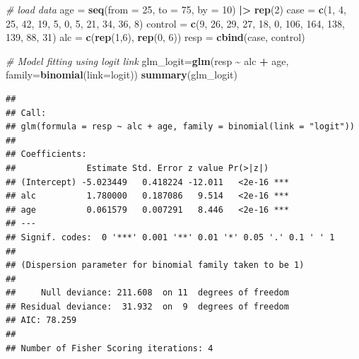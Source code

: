 \documentclass[
]{article}
\newenvironment{Shaded}{\begin{snugshade}}{\end{snugshade}}
\newcommand{\AttributeTok}[1]{\textcolor[rgb]{0.13,0.29,0.53}{#1}}
\newcommand{\CommentTok}[1]{\textcolor[rgb]{0.56,0.35,0.01}{\textit{#1}}}
\newcommand{\DecValTok}[1]{\textcolor[rgb]{0.00,0.00,0.81}{#1}}
\newcommand{\FunctionTok}[1]{\textcolor[rgb]{0.13,0.29,0.53}{\textbf{#1}}}
\newcommand{\NormalTok}[1]{#1}
\newcommand{\OtherTok}[1]{\textcolor[rgb]{0.56,0.35,0.01}{#1}}
\newcommand{\SpecialCharTok}[1]{\textcolor[rgb]{0.81,0.36,0.00}{\textbf{#1}}}
\newcommand{\StringTok}[1]{\textcolor[rgb]{0.31,0.60,0.02}{#1}}
\begin{document}
\begin{Shaded}
\begin{Highlighting}[]
\CommentTok{\# load data}
\NormalTok{age }\OtherTok{=} \FunctionTok{seq}\NormalTok{(}\AttributeTok{from =} \DecValTok{25}\NormalTok{, }\AttributeTok{to =} \DecValTok{75}\NormalTok{, }\AttributeTok{by =} \DecValTok{10}\NormalTok{) }\SpecialCharTok{|\textgreater{}} 
  \FunctionTok{rep}\NormalTok{(}\DecValTok{2}\NormalTok{)}
\NormalTok{case }\OtherTok{=} \FunctionTok{c}\NormalTok{(}\DecValTok{1}\NormalTok{, }\DecValTok{4}\NormalTok{, }\DecValTok{25}\NormalTok{, }\DecValTok{42}\NormalTok{, }\DecValTok{19}\NormalTok{, }\DecValTok{5}\NormalTok{, }\DecValTok{0}\NormalTok{, }\DecValTok{5}\NormalTok{, }\DecValTok{21}\NormalTok{, }\DecValTok{34}\NormalTok{, }\DecValTok{36}\NormalTok{, }\DecValTok{8}\NormalTok{)}
\NormalTok{control }\OtherTok{=} \FunctionTok{c}\NormalTok{(}\DecValTok{9}\NormalTok{, }\DecValTok{26}\NormalTok{, }\DecValTok{29}\NormalTok{, }\DecValTok{27}\NormalTok{, }\DecValTok{18}\NormalTok{, }\DecValTok{0}\NormalTok{, }\DecValTok{106}\NormalTok{, }\DecValTok{164}\NormalTok{, }\DecValTok{138}\NormalTok{, }\DecValTok{139}\NormalTok{, }\DecValTok{88}\NormalTok{, }\DecValTok{31}\NormalTok{)}
\NormalTok{alc }\OtherTok{=} \FunctionTok{c}\NormalTok{(}\FunctionTok{rep}\NormalTok{(}\DecValTok{1}\NormalTok{,}\DecValTok{6}\NormalTok{), }\FunctionTok{rep}\NormalTok{(}\DecValTok{0}\NormalTok{, }\DecValTok{6}\NormalTok{))}
\NormalTok{resp }\OtherTok{=} \FunctionTok{cbind}\NormalTok{(case, control)}

\CommentTok{\# Model fitting using logit link}
\NormalTok{glm\_logit}\OtherTok{=}\FunctionTok{glm}\NormalTok{(resp }\SpecialCharTok{\textasciitilde{}}\NormalTok{ alc }\SpecialCharTok{+}\NormalTok{ age, }\AttributeTok{family=}\FunctionTok{binomial}\NormalTok{(}\AttributeTok{link=}\StringTok{\textquotesingle{}logit\textquotesingle{}}\NormalTok{))}
\FunctionTok{summary}\NormalTok{(glm\_logit)}
\end{Highlighting}
\end{Shaded}

\begin{verbatim}
## 
## Call:
## glm(formula = resp ~ alc + age, family = binomial(link = "logit"))
## 
## Coefficients:
##              Estimate Std. Error z value Pr(>|z|)    
## (Intercept) -5.023449   0.418224 -12.011   <2e-16 ***
## alc          1.780000   0.187086   9.514   <2e-16 ***
## age          0.061579   0.007291   8.446   <2e-16 ***
## ---
## Signif. codes:  0 '***' 0.001 '**' 0.01 '*' 0.05 '.' 0.1 ' ' 1
## 
## (Dispersion parameter for binomial family taken to be 1)
## 
##     Null deviance: 211.608  on 11  degrees of freedom
## Residual deviance:  31.932  on  9  degrees of freedom
## AIC: 78.259
## 
## Number of Fisher Scoring iterations: 4
\end{verbatim}
\end{document}

